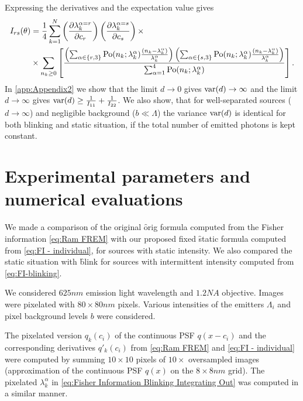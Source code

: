 Expressing the derivatives and the expectation value gives
%
\begin{alignat}{2}
	I_{rs}(\theta)
	&=\frac{1}{4}\sum_{k=1}^N\left(\frac{\partial\lambda_k^{\alpha=r}}{\partial c_r}\right)\left(\frac{\partial\lambda_k^{\alpha=s}}{\partial c_s}\right)\times \nonumber\\
	&\times \sum_{n_k\geq0}\left[\frac{\left(\sum_{\alpha\in \{r,3\}}\mathrm{Po}(n_k;\lambda_k^\alpha)\frac{(n_k-\lambda_k^\alpha)}{\lambda_k^\alpha}\right)\left(\sum_{\alpha\in \{s,3\}}\mathrm{Po}(n_k;\lambda_k^\alpha)\frac{(n_k-\lambda_k^\alpha)}{\lambda_k^\alpha}\right)}{\sum_{\alpha=1}^4\mathrm{Po}(n_k;\lambda_k^\alpha)}\right].
	\label{eq:FI-blinking}
\end{alignat}
%
In \autoref{app:Appendix2} we show that the limit $d\rightarrow0$ gives $\mathrm{var}(d)\rightarrow\infty$ and the limit $d\rightarrow\infty$ gives $\mathrm{var}(d)\geq\frac{1}{I_{11}}+\frac{1}{I_{22}}$. We also show, that for well-separated sources ($d\rightarrow\infty$) and negligible background ($b\ll\Lambda$) the variance $\mathrm{var}(d)$ is identical for both blinking and static situation, if the total number of emitted photons is kept constant. 
\afterpage{\clearpage}

\section{Experimental parameters and numerical evaluations\label{sec:FREM simulations}} 
We made a comparison of the original \f{orig} formula computed from the Fisher information \autoref{eq:Ram FREM} with our proposed fixed \f{static} formula computed from \autoref{eq:FI - individual}, for sources with static intensity. We also compared the static situation with \f{blink} for sources with intermittent intensity computed from \autoref{eq:FI-blinking}.

We considered $625\unit{nm}$ emission light wavelength and $1.2\unit{NA}$ objective. Images were pixelated with $80\times80\unit{nm}$ pixels. Various intensities of the emitters $\Lambda_i$ and pixel background levels $b$ were considered.

The pixelated version $q_k(c_i)$ of the continuous PSF $q(x-c_i)$ and the corresponding derivatives $q'_k(c_i)$ from \autoref{eq:Ram FREM} and \autoref{eq:FI - individual} were computed by summing $10\times10$ pixels of $10\times$ oversampled images (approximation of the continuous PSF $q(x)$ on the $8\times8 \unit{nm}$ grid). The pixelated $\lambda^\alpha_k$ in \autoref{eq:Fisher Information Blinking Integrating Out} was computed in a similar manner. 

